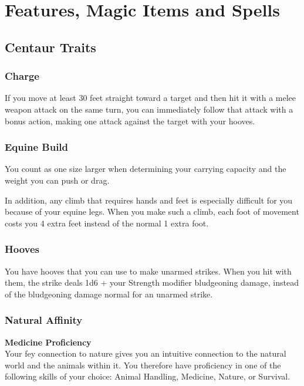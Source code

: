 \documentclass[letterpaper,openany,oneside,twocolumn]{book}
\begin{document}
\onecolumn


\rendercharactersheet

\renderbackgroundsheet

\renderspellsheet


\restoregeometry
\twocolumn

\chapter*{Features, Magic Items and Spells}

\section*{Centaur Traits}
\subsection*{Charge}
If you move at least 30 feet straight toward a target and then hit it with a melee weapon attack on the same turn, you can immediately follow that attack with a bonus action, making one attack against the target with your hooves.
\subsection*{Equine Build}
You count as one size larger when determining your carrying capacity and the weight you can push or drag.

In addition, any climb that requires hands and feet is especially difficult for you because of your equine legs. When you make such a climb, each foot of movement costs you 4 extra feet instead of the normal 1 extra foot.
\subsection*{Hooves}
You have hooves that you can use to make unarmed strikes. When you hit with them, the strike deals 1d6 + your Strength modifier bludgeoning damage, instead of the bludgeoning damage normal for an unarmed strike.
\subsection*{Natural Affinity}
\textbf{Medicine Proficiency}\\
Your fey connection to nature gives you an intuitive connection to the natural world and the animals within it. You therefore have proficiency in one of the following skills of your choice: Animal Handling, Medicine, Nature, or Survival.
\end{document}
